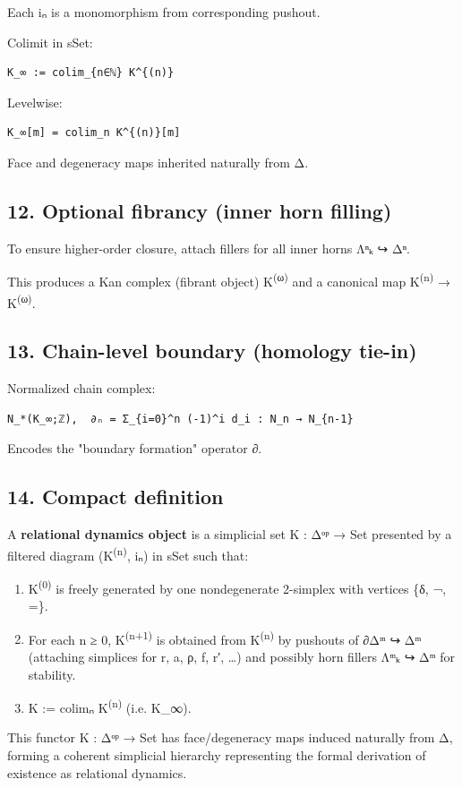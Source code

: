 \documentclass[11pt]{article}
\begin{document}
Each iₙ is a monomorphism from corresponding pushout.

Colimit in sSet:
\begin{verbatim}
K_∞ := colim_{n∈ℕ} K^{(n)}
\end{verbatim}

Levelwise:
\begin{verbatim}
K_∞[m] = colim_n K^{(n)}[m]
\end{verbatim}

Face and degeneracy maps inherited naturally from Δ.
\subsection*{12. Optional fibrancy (inner horn filling)}
\label{sec:org5c43af0}
To ensure higher-order closure, attach fillers for all inner horns Λⁿₖ ↪ Δⁿ.

This produces a Kan complex (fibrant object) K\textsuperscript{(ω)}
and a canonical map K\textsuperscript{(n)} → K\textsuperscript{(ω)}.
\subsection*{13. Chain-level boundary (homology tie-in)}
\label{sec:org1410300}
Normalized chain complex:
\begin{verbatim}
N_*(K_∞;ℤ),  ∂ₙ = Σ_{i=0}^n (-1)^i d_i : N_n → N_{n-1}
\end{verbatim}

Encodes the "boundary formation" operator ∂.
\subsection*{14. Compact definition}
\label{sec:org22786df}
A \textbf{relational dynamics object} is a simplicial set K : Δᵒᵖ → Set
presented by a filtered diagram (K\textsuperscript{(n)}, iₙ) in sSet such that:

\begin{enumerate}
\item K\textsuperscript{(0)} is freely generated by one nondegenerate 2-simplex
with vertices \{δ, ¬, =\}.
\item For each n ≥ 0, K\textsuperscript{(n+1)} is obtained from K\textsuperscript{(n)} by
pushouts of ∂Δᵐ ↪ Δᵐ (attaching simplices for r, a, ρ, f, r′, …)
and possibly horn fillers Λᵐₖ ↪ Δᵐ for stability.
\item K := colimₙ K\textsuperscript{(n)} (i.e. K\_∞).
\end{enumerate}

This functor K : Δᵒᵖ → Set has face/degeneracy maps induced naturally
from Δ, forming a coherent simplicial hierarchy representing
the formal derivation of existence as relational dynamics.
\end{document}
